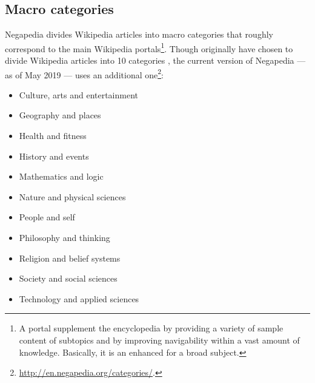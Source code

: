         \subsection{Macro categories}
            Negapedia divides Wikipedia articles into macro categories that roughly correspond to the main Wikipedia portals\footnote{A portal supplement the encyclopedia by providing a variety of sample content of subtopics and by improving navigability within a vast amount of knowledge. Basically, it is an enhanced  for a broad subject.}. Though originally \citeauthor{MarchioriNegapedia} have chosen to divide Wikipedia articles into 10 categories \cite{MarchioriNegapedia}, the current version of Negapedia --- as of May 2019 --- uses an additional one\footnote{\url{http://en.negapedia.org/categories/}.}:
            \begin{multicols}{2}
                \begin{itemize}
                    \item Culture, arts and entertainment
                    \item Geography and places
                    \item Health and fitness
                    \item History and events
                    \item Mathematics and logic
                    \item Nature and physical sciences
                    \item People and self
                    \item Philosophy and thinking
                    \item Religion and belief systems
                    \item Society and social sciences
                    \item Technology and applied sciences
                \end{itemize}
            \end{multicols}
